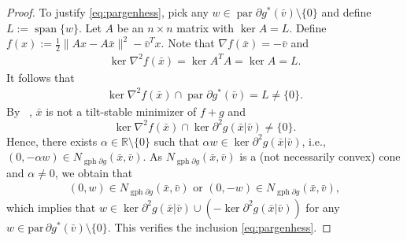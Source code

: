 \documentclass[reqno]{amsart}
\numberwithin{equation}{section}
\newcommand{\R}{\mathbb{R}}
\newcommand{\x}{\bar{x}}
\newcommand{\para}{\mathrm{par}\,}
\begin{document}
\begin{proof}
 To justify \eqref{eq:pargenhess}, pick any $w \in \operatorname{par} \partial g^* (\bar{v}) \setminus \{0\}$
    and define $L := \operatorname{span}\{w\}$. Let $A$ be an $n\times n$ matrix with $\ker A = L$.
    Define $f(x) := \frac{1}{2} \lVert Ax - A \bar{x} \rVert^2 - \bar{v}^T x$.
    Note that $\nabla f(\bar{x}) = - \bar{v}$ and \begin{align*}
        \ker \nabla^2 f(\x) = \ker A^TA = \ker A = L.
     \end{align*} It follows that 
     \begin{align*}
        \ker \nabla^2 f(\x) \cap \operatorname{par} \partial g^* (\bar{v}) = L \not = \{0\}.
     \end{align*}
     By ~, $\x$ is not a tilt-stable minimizer of $f + g$
    and \[
    \ker \nabla^2 f(\x) \cap \ker \partial^2 g(\x | \bar{v}) \not = \{0\}.
    \]
    Hence, there exists $\alpha \in \R \setminus \{0\}$ such that $\alpha w \in \ker \partial^2 g (\x | \bar{v})$, i.e., 
    $(0, - \alpha w) \in N_{\operatorname{gph} \partial g}(\bar{x}, \bar{v})$.
    As $N_{\operatorname{gph} \partial g}(\bar{x}, \bar{v})$ is a (not necessarily convex) cone and $\alpha \not = 0$,
    we obtain that \begin{align*}
        (0, w) \in N_{\operatorname{gph} \partial g}(\bar{x}, \bar{v}) \text{ or } (0, -w) \in N_{\operatorname{gph} \partial g}(\bar{x}, \bar{v}),
    \end{align*} 
    which implies that $w\in \ker \partial^2 g(\bar{x} | \bar{v}) \cup (- \ker \partial^2 g(\bar{x} | \bar{v}))$ for any $w\in\para \partial g^* (\bar{v}) \setminus \{0\}$. This verifies 
    the inclusion \eqref{eq:pargenhess}.


\end{proof}
\end{document}
